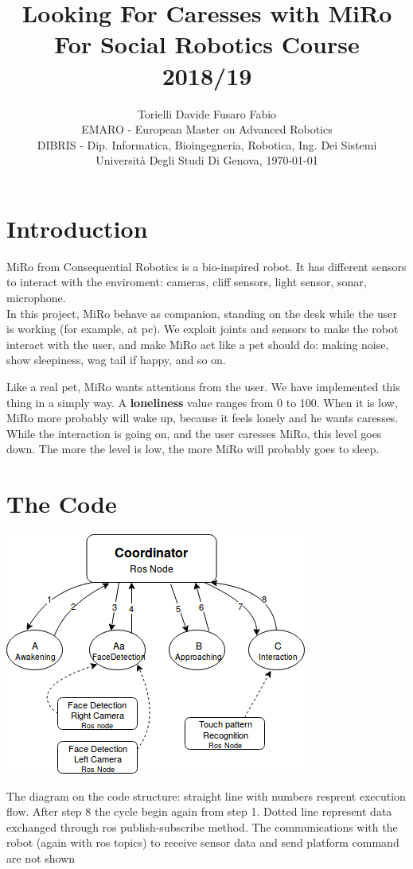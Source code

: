 \documentclass[12pt,peerreviewca, a4paper, onecolumn]{article}
\title{\LARGE\textbf{Looking For Caresses with MiRo}\\\large For Social Robotics Course 2018/19}
\author{\large{Torielli Davide \quad Fusaro Fabio} \\
	\small EMARO - European Master on Advanced Robotics\\
	\small DIBRIS - Dip. Informatica, Bioingegneria, Robotica, Ing. Dei Sistemi\\
	\small Universit\`{a} Degli Studi Di Genova, \today}
\begin{document}
	\maketitle
	
	\section{Introduction}
	MiRo from Consequential Robotics is a bio-inspired robot. It has different sensors to interact with the enviroment: cameras, cliff sensors, light sensor, sonar, microphone.\\
	In this project, MiRo behave as companion, standing on the desk while the user is working (for example, at pc). We exploit joints and sensors to make the robot interact with the user, and make MiRo act like a pet should do: making noise, show sleepiness, wag tail if happy, and so on.	
	
	Like a real pet, MiRo wants attentions from the user. We have implemented this thing in a simply way. A \textbf{loneliness} value ranges from 0 to 100. When it is low, MiRo more probably will wake up, because it feels lonely and he wants caresses. While the interaction is going on, and the user caresses  MiRo, this level goes down. The more the level is low, the more MiRo will probably goes to sleep.
	
	\section{The Code}
	\begin{center}
		\includegraphics[scale=0.5]{diagram}
	\end{center}
	{\small The diagram on the code structure: straight line with numbers resprent execution flow. After step 8 the cycle begin again from step 1. Dotted line represent data exchanged through ros publish-subscribe method.  The communications with the robot (again with ros topics) to receive sensor data and send platform command are not shown}\\
\end{document}
